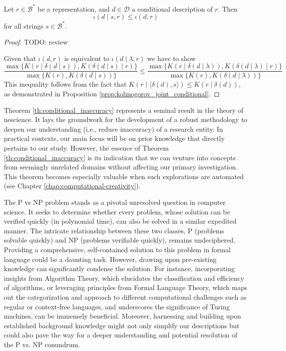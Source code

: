 \begin{theorem}
\label{th:conditional_inaccuracy}
Let $r \in \mathcal{B}^\ast$ be a representation, and $d \in \mathcal{D}$ a conditional description of $r$. Then
\[
\iota(d \mid s, r) \leq \iota(d , r)
\]
for all strings $s \in \mathcal{B}^\ast$.
\end{theorem}
\begin{proof}
{\color{red} TODO: review

Given that $\iota(d , r)$ is equivalent to $\iota(d \mid \lambda, r)$ we have to show 
\[
\frac{ \max\{ K \left(r \mid \delta(d \mid s) \right), K \left( \delta(d \mid s) \mid r \right) \} } { \max\{ K(r), K \left( \delta(d \mid s) \right) \} } \leq \frac{ \max\{ K \left(r \mid \delta(d \mid \lambda ) \right), K \left( \delta(d \mid \lambda ) \mid r \right) \} } { \max\{ K(r), K \left( \delta(d \mid \lambda ) \right) \} }
\]
This inequality follows from the fact that $K \left(r \mid \langle \delta(d), s \rangle \right) \leq  K \left(r \mid \delta(d) \right)$, as demonstrated in Proposition \ref{prop:kolmogorov_joint_conditional}.
}
\end{proof}

Theorem \ref{th:conditional_inaccuracy} represents a seminal result in the theory of nescience. It lays the groundwork for the development of a robust methodology to deepen our understanding (i.e., reduce inaccuracy) of a research entity. In practical contexts, our main focus will be on prior knowledge that directly pertains to our study. However, the essence of Theorem \ref{th:conditional_inaccuracy} is its indication that we can venture into concepts from seemingly unrelated domains without affecting our primary investigation. This theorem becomes especially valuable when such explorations are automated (see Chapter \ref{chap:computational-creativity}).

\begin{example}
The P vs NP problem stands as a pivotal unresolved question in computer science. It seeks to determine whether every problem, whose solution can be verified quickly (in polynomial time), can also be solved in a similar expedited manner. The intricate relationship between these two classes, P (problems solvable quickly) and NP (problems verifiable quickly), remains undeciphered. Providing a comprehensive, self-contained solution to this problem in formal language could be a daunting task. However, drawing upon pre-existing knowledge can significantly condense the solution. For instance, incorporating insights from Algorithm Theory, which elucidates the classification and efficiency of algorithms, or leveraging principles from Formal Language Theory, which maps out the categorization and approach to different computational challenges such as regular or context-free languages, and underscores the significance of Turing machines, can be immensely beneficial. Moreover, harnessing and building upon established background knowledge might not only simplify our descriptions but could also pave the way for a deeper understanding and potential resolution of the P vs. NP conundrum.

\end{example}

